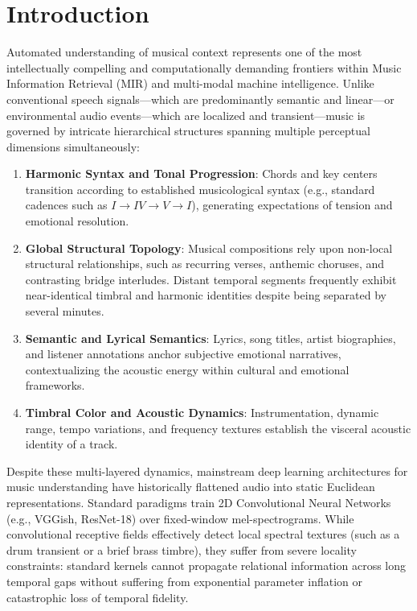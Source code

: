 \documentclass{article}
\begin{document}
\section{Introduction}
\label{sec:intro}
Automated understanding of musical context represents one of the most intellectually compelling and computationally demanding frontiers within Music Information Retrieval (MIR) and multi-modal machine intelligence. Unlike conventional speech signals—which are predominantly semantic and linear—or environmental audio events—which are localized and transient—music is governed by intricate hierarchical structures spanning multiple perceptual dimensions simultaneously:
\begin{enumerate}
    \item \textbf{Harmonic Syntax and Tonal Progression}: Chords and key centers transition according to established musicological syntax (e.g., standard cadences such as $I \rightarrow IV \rightarrow V \rightarrow I$), generating expectations of tension and emotional resolution.
    \item \textbf{Global Structural Topology}: Musical compositions rely upon non-local structural relationships, such as recurring verses, anthemic choruses, and contrasting bridge interludes. Distant temporal segments frequently exhibit near-identical timbral and harmonic identities despite being separated by several minutes.
    \item \textbf{Semantic and Lyrical Semantics}: Lyrics, song titles, artist biographies, and listener annotations anchor subjective emotional narratives, contextualizing the acoustic energy within cultural and emotional frameworks.
    \item \textbf{Timbral Color and Acoustic Dynamics}: Instrumentation, dynamic range, tempo variations, and frequency textures establish the visceral acoustic identity of a track.
\end{enumerate}

Despite these multi-layered dynamics, mainstream deep learning architectures for music understanding have historically flattened audio into static Euclidean representations. Standard paradigms train 2D Convolutional Neural Networks (e.g., VGGish, ResNet-18) over fixed-window mel-spectrograms. While convolutional receptive fields effectively detect local spectral textures (such as a drum transient or a brief brass timbre), they suffer from severe locality constraints: standard kernels cannot propagate relational information across long temporal gaps without suffering from exponential parameter inflation or catastrophic loss of temporal fidelity.
\end{document}
